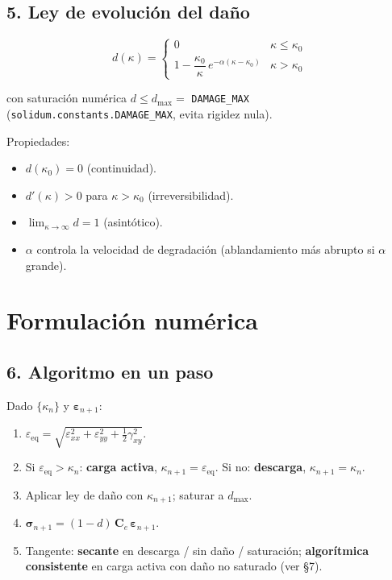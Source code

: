 \documentclass[11pt,letterpaper,oneside]{report}
\begin{document}
\subsection{5. Ley de evolución del daño}

\[
d(\kappa) = \begin{cases}
0 & \kappa \leq \kappa_0 \\
1 - \dfrac{\kappa_0}{\kappa}\,e^{-\alpha(\kappa - \kappa_0)} & \kappa > \kappa_0
\end{cases}
\]

con saturación numérica $d \leq d_\text{max} = $ \texttt{DAMAGE\_MAX} (\texttt{solidum.constants.DAMAGE\_MAX}, evita rigidez nula).

Propiedades:
\begin{itemize}
  \item $d(\kappa_0) = 0$ (continuidad).
  \item $d'(\kappa) > 0$ para $\kappa > \kappa_0$ (irreversibilidad).
  \item $\lim_{\kappa \to \infty} d = 1$ (asintótico).
  \item $\alpha$ controla la velocidad de degradación (ablandamiento más abrupto si $\alpha$ grande).
\end{itemize}


\section{Formulación numérica}

\subsection{6. Algoritmo en un paso}

Dado $\{\kappa_n\}$ y $\boldsymbol\varepsilon_{n+1}$:

\begin{enumerate}
  \item $\varepsilon_\text{eq} = \sqrt{\varepsilon_{xx}^2 + \varepsilon_{yy}^2 + \tfrac{1}{2}\gamma_{xy}^2}$.
  \item Si $\varepsilon_\text{eq} > \kappa_n$: \textbf{carga activa}, $\kappa_{n+1} = \varepsilon_\text{eq}$. Si no: \textbf{descarga}, $\kappa_{n+1} = \kappa_n$.
  \item Aplicar ley de daño con $\kappa_{n+1}$; saturar a $d_\text{max}$.
  \item $\boldsymbol\sigma_{n+1} = (1 - d)\,\mathbf C_e\,\boldsymbol\varepsilon_{n+1}$.
  \item Tangente: \textbf{secante} en descarga / sin daño / saturación; \textbf{algorítmica consistente} en carga activa con daño no saturado (ver §7).
\end{enumerate}
\end{document}

